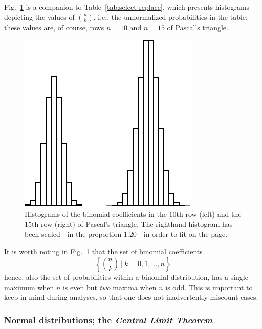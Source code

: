 Fig.~\ref{fig:gaussiandistribution} is a companion to Table~\ref{tab:select-replace}, which presents histograms depicting the values of $\displaystyle {n \choose k}$, i.e., the unnormalized probabilities in the table; these values are, of course, rows $n =10$ and $n=15$ of Pascal's triangle.
\begin{figure}[htb]
\begin{center}
        \includegraphics[scale=0.45]{FiguresMaths/ProbaGaussianDistribution}
        \caption{Histograms of the binomial coefficients in the $10$th row (left) and the $15$th row (right) of Pascal's triangle.  The righthand histogram has been scaled---in the proportion 1:20---in order to fit on the page.}
        \label{fig:gaussiandistribution}
\end{center}
\end{figure}

It is worth noting in Fig.~\ref{fig:gaussiandistribution} that the set of binomial coefficients
\[ \left\{ {n \choose k} \ | \ k = 0, 1, \ldots, n \right\} \]
hence, also the set of probabilities within a binomial distribution, has a single maximum when $n$ is even but {\em two} maxima when $n$ is odd.  This is important to keep in mind during analyses, so that one does not inadvertently miscount cases.


\subsubsection{Normal distributions; the {\em Central Limit Theorem}} 
\label{sec:normal-distr}

  
 


